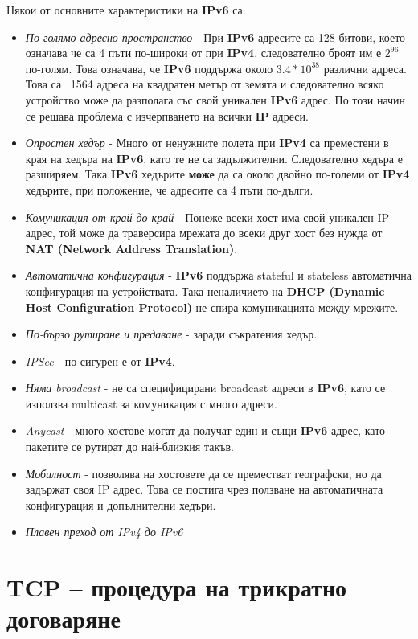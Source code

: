 \documentclass[fleqn,12pt]{article}
\begin{document}
Някои от основните характеристики на \textbf{IPv6} са:
\begin{itemize}
    \item \textit{По-голямо адресно пространство} - При \textbf{IPv6} адресите са 128-битови, което означава че са 4 пъти по-широки от при \textbf{IPv4}, 
    следователно броят им е $2^{96}$ по-голям.
    Това означава, че \textbf{IPv6} поддържа около $3.4 * 10^{38}$ различни адреса.
    Това са ~1564 адреса на квадратен метър от земята и следователно всяко устройство може да разполага със свой уникален \textbf{IPv6} адрес.
    По този начин се решава проблема с изчерпването на всички \textbf{IP} адреси.
    \item \textit{Опростен хедър} - Много от ненужните полета при \textbf{IPv4} са преместени в края на хедъра на \textbf{IPv6}, като те не са задължителни.
    Следователно хедъра е разширяем.
    Така \textbf{IPv6} хедърите \textbf{може} да са около двойно по-големи от \textbf{IPv4} хедърите, при положение, че адресите са 4 пъти по-дълги.
    \item \textit{Комуникация от край-до-край} - Понеже всеки хост има свой уникален IP адрес, той може да траверсира мрежата до всеки друг хост без нужда от \textbf{NAT (Network Address Translation)}.
    \item \textit{Автоматична конфигурация} - \textbf{IPv6} поддържа stateful и stateless автоматична конфигурация на устройствата.
    Така неналичието на \textbf{DHCP (Dynamic Host Configuration Protocol)} не спира комуникацията между мрежите.
    \item \textit{По-бързо рутиране и предаване} - заради съкратения хедър.
    \item \textit{IPSec} - по-сигурен е от \textbf{IPv4}.
    \item \textit{Няма broadcast} - не са специфицирани broadcast адреси в \textbf{IPv6}, като се използва multicast за комуникация с много адреси.
    \item \textit{Anycast} - много хостове могат да получат един и същи \textbf{IPv6} адрес, като пакетите се рутират до най-близкия такъв.
    \item \textit{Мобилност} - позволява на хостовете да се преместват географски, но да задържат своя IP адрес.
    Това се постига чрез ползване на автоматичната конфигурация и допълнителни хедъри.
    \item \textit{Плавен преход от IPv4 до IPv6}
\end{itemize}

\section{TCP – процедура на трикратно договаряне}
\end{document}
